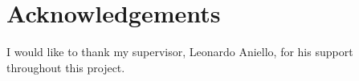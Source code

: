 \section*{Acknowledgements}

I would like to thank my supervisor, Leonardo Aniello, for his support throughout this project.
